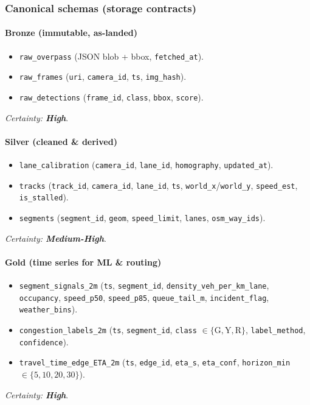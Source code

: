 \subsubsection{Canonical schemas (storage contracts)}
\paragraph{Bronze (immutable, as-landed)}
\begin{itemize}
  \item \texttt{raw\_overpass} (JSON blob + bbox, \texttt{fetched\_at}).
  \item \texttt{raw\_frames} (\texttt{uri}, \texttt{camera\_id}, \texttt{ts}, \texttt{img\_hash}).
  \item \texttt{raw\_detections} (\texttt{frame\_id}, \texttt{class}, \texttt{bbox}, \texttt{score}).
\end{itemize}
	\textit{Certainty: \textbf{High}}.

\paragraph{Silver (cleaned \& derived)}
\begin{itemize}
  \item \texttt{lane\_calibration} (\texttt{camera\_id}, \texttt{lane\_id}, \texttt{homography}, \texttt{updated\_at}).
  \item \texttt{tracks} (\texttt{track\_id}, \texttt{camera\_id}, \texttt{lane\_id}, \texttt{ts}, \texttt{world\_x}/\texttt{world\_y}, \texttt{speed\_est}, \texttt{is\_stalled}).
  \item \texttt{segments} (\texttt{segment\_id}, \texttt{geom}, \texttt{speed\_limit}, \texttt{lanes}, \texttt{osm\_way\_ids}).
\end{itemize}
	\textit{Certainty: \textbf{Medium-High}}.

\paragraph{Gold (time series for ML \& routing)}
\begin{itemize}
  \item \texttt{segment\_signals\_2m} (\texttt{ts}, \texttt{segment\_id}, \texttt{density\_veh\_per\_km\_lane}, \texttt{occupancy}, \texttt{speed\_p50}, \texttt{speed\_p85}, \texttt{queue\_tail\_m}, \texttt{incident\_flag}, \texttt{weather\_bins}).
  \item \texttt{congestion\_labels\_2m} (\texttt{ts}, \texttt{segment\_id}, \texttt{class} $\in \{\text{G},\text{Y},\text{R}\}$, \texttt{label\_method}, \texttt{confidence}).
  \item \texttt{travel\_time\_edge\_ETA\_2m} (\texttt{ts}, \texttt{edge\_id}, \texttt{eta\_s}, \texttt{eta\_conf}, \texttt{horizon\_min} $\in \{5,10,20,30\}$).
\end{itemize}
	\textit{Certainty: \textbf{High}}.


